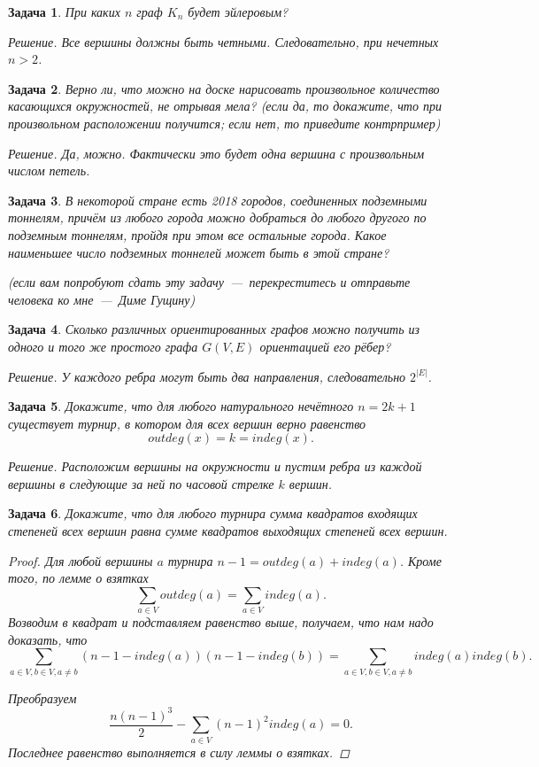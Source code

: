 \documentclass[12pt,a4paper,fleqn]{article}
\newtheorem{exersize}{Задача}
\begin{document}
\begin{exersize}
	При каких $n$ граф $K_n$ будет эйлеровым?
	
	\emph{Решение.} Все вершины должны быть четными. Следовательно, при нечетных $n > 2$.
\end{exersize}

\begin{exersize}
	Верно ли, что можно на доске нарисовать произвольное количество касающихся окружностей, не отрывая мела? (если да, то докажите, что при произвольном расположении получится; если нет, то приведите контрпример)
	
	\emph{Решение.} Да, можно. Фактически это будет одна вершина с произвольным числом петель.
\end{exersize}

\begin{exersize}
	В некоторой стране есть 2018 городов, соединенных подземными тоннелям, причём из любого города можно добраться до любого другого по подземным тоннелям, пройдя при этом все остальные города. Какое наименьшее число подземных тоннелей может быть в этой стране?
	
	(если вам попробуют сдать эту задачу~---~перекреститесь и отправьте человека ко мне~---~Диме Гущину)
\end{exersize}

\begin{exersize}
	Сколько различных ориентированных графов можно получить из одного и того же простого графа $G(V, E)$ ориентацией его рёбер?
	
	\emph{Решение.} У каждого ребра могут быть два направления, следовательно $2^{|E|}$.
\end{exersize}

\begin{exersize}
	Докажите, что для любого натурального нечётного $n = 2k + 1$ существует турнир, в котором для всех вершин верно равенство
	$$outdeg (x) = k = indeg (x).$$
	
	\emph{Решение.} Расположим вершины на окружности и пустим ребра из каждой вершины в следующие за ней по часовой стрелке $k$ вершин.
\end{exersize}

\begin{exersize}
	Докажите, что для любого турнира сумма квадратов входящих степеней всех вершин равна сумме квадратов выходящих степеней всех вершин.
	
\begin{proof}
	Для любой вершины $a$ турнира $n-1 = outdeg(a) + indeg(a)$. Кроме того, по лемме о взятках $$\sum_{a \in V} outdeg (a) = \sum_{a \in V} indeg (a).$$
	Возводим в квадрат и подставляем равенство выше, получаем, что нам надо доказать, что 
	$$\sum_{a \in V, b \in V,  a \neq b} (n-1 - indeg(a))(n-1 - indeg(b)) = \sum_{a \in V, b \in V,  a \neq b} indeg(a)indeg(b).$$
	
	Преобразуем $$\frac{n(n-1)^3}{2} - \sum_{a \in V} (n-1)^2 indeg(a) = 0.$$
	Последнее равенство выполняется в силу леммы о взятках.
\end{proof}
\end{exersize}
\end{document}
